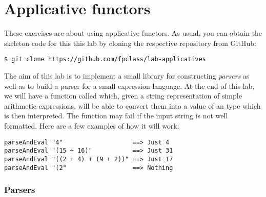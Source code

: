 \section{Applicative functors}

These exercises are about using applicative functors. As usual, you can obtain the skeleton code for this this lab by cloning the respective repository from GitHub:
\begin{verbatim}
$ git clone https://github.com/fpclass/lab-applicatives
\end{verbatim}
The aim of this lab is to implement a small library for constructing \emph{parsers} as well as to build a parser for a small expression language. At the end of this lab, we will have a function called  which, given a string representation of simple arithmetic expressions, will be able to convert them into a value of an  type which is then interpreted. The  function may fail if the input string is not well formatted. Here are a few examples of how it will work:
\begin{verbatim}
parseAndEval "4"                   ==> Just 4
parseAndEval "(15 + 16)"           ==> Just 31
parseAndEval "((2 + 4) + (9 + 2))" ==> Just 17
parseAndEval "(2"                  ==> Nothing
\end{verbatim}

\subsubsection{Parsers}

